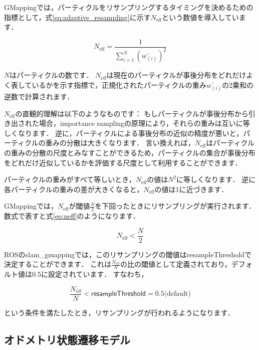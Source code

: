 \documentclass[{../../master}]{subfiles}
\begin{document}
GMappingでは，パーティクルをリサンプリングするタイミングを決めるための指標として，式\ref{eq:adaptive_resampling}に示す$N_{\text{eff}}$という数値を導入しています．

\begin{equation}
  N_{\text{eff}} = \frac{1}{\sum_{i=1}^{N} (\tilde{w_{(i)}})^2}
  \label{eq:adaptive_resampling}
\end{equation}

$N$はパーティクルの数です．
$N_{\text{eff}}$は現在のパーティクルが事後分布をどれだけよく表しているかを示す指標で，正規化されたパーティクルの重み$\tilde{w_{(i)}}$の2乗和の逆数で計算されます．

$N_{\text{eff}}$の直観的理解は以下のようなものです：
もしパーティクルが事後分布から引き出された場合，importance samplingの原理により，それらの重みは互いに等しくなります．
逆に，パーティクルによる事後分布の近似の精度が悪いと，パーティクルの重みの分散は大きくなります．
言い換えれば，$N_{\text{eff}}$はパーティクルの重みの分散の尺度とみなすことができるため，パーティクルの集合が事後分布をどれだけ近似しているかを評価する尺度として利用することができます．

パーティクルの重みがすべて等しいとき，$N_{\text{eff}}$の値は$N^2$に等しくなります．
逆に各パーティクルの重みの差が大きくなると，$N_{\text{eff}}$の値は1に近づきます．

GMappingでは，$N_{\text{eff}}$が閾値$\frac{N}{2}$を下回ったときにリサンプリングが実行されます．\cite{Gmapping}
数式で表すと式\ref{eq:neff}のようになります．

\begin{equation}
  N_{\text{eff}} < \frac{N}{2}
  \label{eq:neff}
\end{equation}

ROSの\textsf{slam\_gmapping}では，このリサンプリングの閾値は\textsf{resampleThreshold}で決定することができます．
これは$\frac{N_{\text{eff}}}{N}$の比の閾値として定義されており，デフォルト値は0.5に設定されています．
すなわち，

\begin{equation}
  \frac{N_{\text{eff}}}{N} < \textsf{resampleThreshold} = 0.5 \text{(default)}
  \label{eq:neff_ros}
\end{equation}

\noindent
という条件を満たしたとき，リサンプリングが行われるようになります．

\subsection{オドメトリ状態遷移モデル}
\label{sec:motion_model_odometry}
\end{document}
